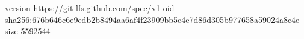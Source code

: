 version https://git-lfs.github.com/spec/v1
oid sha256:676b646c6e9edb2b8494aa6af4f23909bb5c4e7d86d305b977658a59024a8c4e
size 5592544
